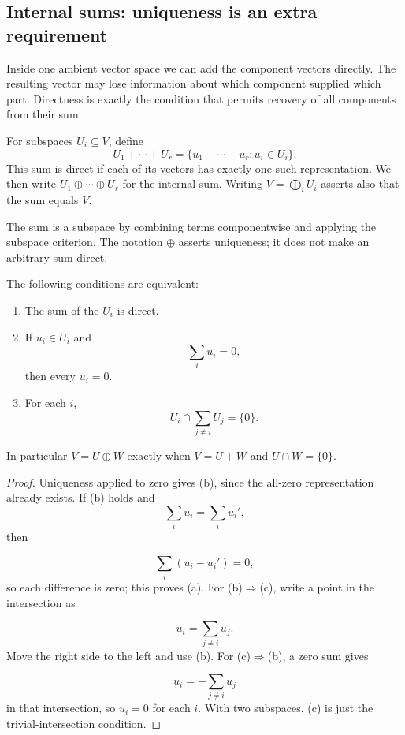 \subsection{Internal sums: uniqueness is an extra requirement}

Inside one ambient vector space we can add the component vectors directly.
The resulting vector may lose information about which component supplied
which part. Directness is exactly the condition that permits recovery of
all components from their sum.

\begin{definition}
For subspaces $U_i\subseteq V$, define
\[
U_1+\cdots+U_r=\{u_1+\cdots+u_r:u_i\in U_i\}.
\]
This sum is direct if each of its vectors has exactly one such representation.
We then write $U_1\oplus\cdots\oplus U_r$ for the internal sum.
Writing $V=\bigoplus_iU_i$ asserts also that the sum equals $V$.
\end{definition}
The sum is a subspace by combining terms componentwise and applying the
subspace criterion. The notation $\oplus$ asserts uniqueness; it does not
make an arbitrary sum direct.
\begin{theorem}\label{thm:direct-sum-criterion}
The following conditions are equivalent:
\begin{enumerate}
\item The sum of the $U_i$ is direct.
\item If $u_i\in U_i$ and
\[
\sum_i u_i=0,
\]
 then every $u_i=0$.
\item For each $i$,
\[
U_i\cap\sum_{j\ne i}U_j=\{0\}.
\]

\end{enumerate}
In particular $V=U\oplus W$ exactly when $V=U+W$ and $U\cap W=\{0\}$.
\end{theorem}
\begin{proof}
Uniqueness applied to zero gives (b), since the all-zero representation
already exists. If (b) holds and
\[
\sum_i u_i=\sum_i u_i',
\]
 then

\[
\sum_i(u_i-u_i')=0,
\]
 so each difference is zero; this proves (a).
For (b)$\Rightarrow$(c), write a point in the intersection as

\[
u_i=\sum_{j\ne i}u_j.
\]
 Move the right side to the left and use (b).
For (c)$\Rightarrow$(b), a zero sum gives

\[
u_i=-\sum_{j\ne i}u_j
\]
 in that intersection, so $u_i=0$ for each $i$.
With two subspaces, (c) is just the trivial-intersection condition.
\end{proof}
